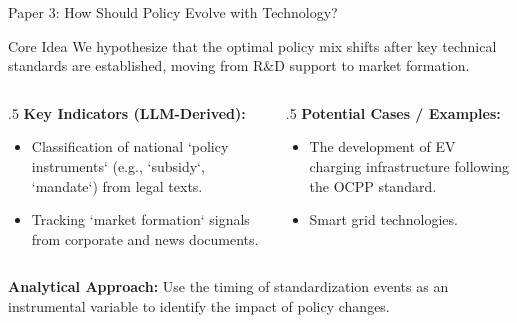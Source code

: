 \documentclass[10pt, aspectratio=169]{beamer}
\begin{document}
\begin{frame}{Paper 3: How Should Policy Evolve with Technology?}
    \begin{block}{Core Idea}
        \alert{We hypothesize that the optimal policy mix shifts after key technical standards are established, moving from R\&D support to market formation.}
    \end{block}
    
    \vfill
    
    \begin{columns}[T]
        \begin{column}{.5\textwidth}
            \textbf{Key Indicators (LLM-Derived):}
            \begin{itemize}
                \item Classification of national `policy instruments` (e.g., `subsidy`, `mandate`) from legal texts.
                \item Tracking `market formation` signals from corporate and news documents.
            \end{itemize}
        \end{column}
        \begin{column}{.5\textwidth}
            \textbf{Potential Cases / Examples:}
            \begin{itemize}
                \item The development of EV charging infrastructure following the OCPP standard.
                \item Smart grid technologies.
            \end{itemize}
        \end{column}
    \end{columns}
    
    \vfill
    \textbf{\textcolor{aauDarkOrange}{Analytical Approach:}} Use the timing of standardization events as an instrumental variable to identify the impact of policy changes.
\end{frame}
\end{document}
